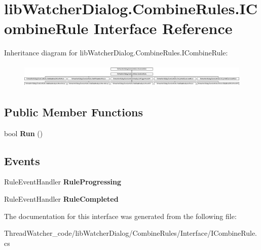 \hypertarget{interfacelib_watcher_dialog_1_1_combine_rules_1_1_i_combine_rule}{\section{lib\+Watcher\+Dialog.\+Combine\+Rules.\+I\+Combine\+Rule Interface Reference}
\label{interfacelib_watcher_dialog_1_1_combine_rules_1_1_i_combine_rule}
}
Inheritance diagram for lib\+Watcher\+Dialog.\+Combine\+Rules.\+I\+Combine\+Rule\+:\begin{figure}[H]
\begin{center}
\leavevmode
\includegraphics[height=1.163636cm]{interfacelib_watcher_dialog_1_1_combine_rules_1_1_i_combine_rule}
\end{center}
\end{figure}
\subsection*{Public Member Functions}
\begin{DoxyCompactItemize}
\item 
\hypertarget{interfacelib_watcher_dialog_1_1_combine_rules_1_1_i_combine_rule_a05b709167985a75e2216bdacb32dae5f}{bool {\bfseries Run} ()}\label{interfacelib_watcher_dialog_1_1_combine_rules_1_1_i_combine_rule_a05b709167985a75e2216bdacb32dae5f}

\end{DoxyCompactItemize}
\subsection*{Events}
\begin{DoxyCompactItemize}
\item 
\hypertarget{interfacelib_watcher_dialog_1_1_combine_rules_1_1_i_combine_rule_a5e939f56a635c317456c5d1794027a57}{Rule\+Event\+Handler {\bfseries Rule\+Progressing}}\label{interfacelib_watcher_dialog_1_1_combine_rules_1_1_i_combine_rule_a5e939f56a635c317456c5d1794027a57}

\item 
\hypertarget{interfacelib_watcher_dialog_1_1_combine_rules_1_1_i_combine_rule_ac0d1b86b6d74eb38a4c1c222ec5ec35d}{Rule\+Event\+Handler {\bfseries Rule\+Completed}}\label{interfacelib_watcher_dialog_1_1_combine_rules_1_1_i_combine_rule_ac0d1b86b6d74eb38a4c1c222ec5ec35d}

\end{DoxyCompactItemize}


The documentation for this interface was generated from the following file\+:\begin{DoxyCompactItemize}
\item 
Thread\+Watcher\+\_\+code/lib\+Watcher\+Dialog/\+Combine\+Rules/\+Interface/I\+Combine\+Rule.\+cs\end{DoxyCompactItemize}
